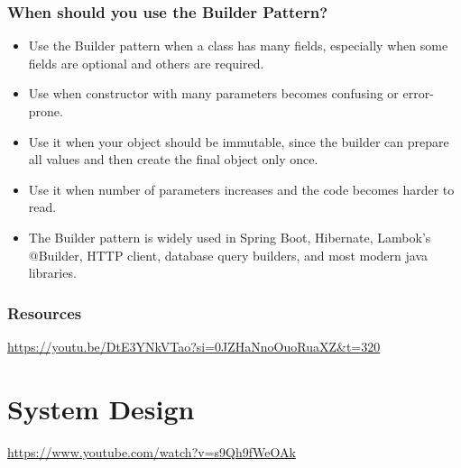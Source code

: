 \documentclass[11pt]{article}
\begin{document}
\subsubsection{When should you use the Builder Pattern?}
\label{sec:org58c163c}
\begin{itemize}
\item Use the Builder pattern when a class has many fields, especially when some fields are optional and others are required.
\item Use when constructor with many parameters becomes confusing or error-prone.
\item Use it when your object should be immutable, since the builder can prepare all values and then create the final object only once.
\item Use it when number of parameters increases and the code becomes harder to read.
\item The Builder pattern is widely used in Spring Boot, Hibernate, Lambok's @Builder, HTTP client, database query builders, and most modern java libraries.
\end{itemize}
\subsubsection{Resources}
\label{sec:org7a1d698}
\url{https://youtu.be/DtE3YNkVTao?si=0JZHaNnoOuoRuaXZ\&t=320}
\section{System Design}
\label{sec:orgd347e00}
\url{https://www.youtube.com/watch?v=s9Qh9fWeOAk}
\end{document}
